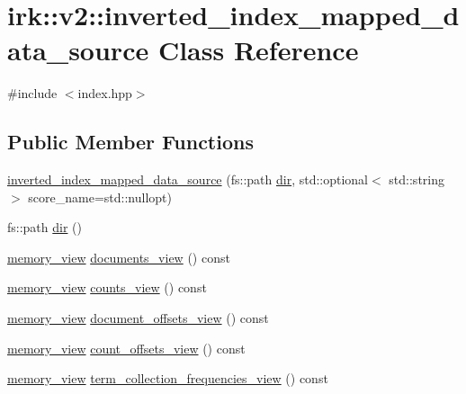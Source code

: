 \hypertarget{classirk_1_1v2_1_1inverted__index__mapped__data__source}{}\section{irk\+:\+:v2\+:\+:inverted\+\_\+index\+\_\+mapped\+\_\+data\+\_\+source Class Reference}
\label{classirk_1_1v2_1_1inverted__index__mapped__data__source}


{\ttfamily \#include $<$index.\+hpp$>$}

\subsection*{Public Member Functions}
\begin{DoxyCompactItemize}
\item 
\mbox{\hyperlink{classirk_1_1v2_1_1inverted__index__mapped__data__source_ac0d35968322d01a287985563b0fe7944}{inverted\+\_\+index\+\_\+mapped\+\_\+data\+\_\+source}} (fs\+::path \mbox{\hyperlink{classirk_1_1v2_1_1inverted__index__mapped__data__source_af8e4ab45e3616f308c50f86b8059d4bc}{dir}}, std\+::optional$<$ std\+::string $>$ score\+\_\+name=std\+::nullopt)
\item 
fs\+::path \mbox{\hyperlink{classirk_1_1v2_1_1inverted__index__mapped__data__source_af8e4ab45e3616f308c50f86b8059d4bc}{dir}} ()
\item 
\mbox{\hyperlink{classirk_1_1memory__view}{memory\+\_\+view}} \mbox{\hyperlink{classirk_1_1v2_1_1inverted__index__mapped__data__source_ab0f63b289b23eff5f3bc45e37fb4caca}{documents\+\_\+view}} () const
\item 
\mbox{\hyperlink{classirk_1_1memory__view}{memory\+\_\+view}} \mbox{\hyperlink{classirk_1_1v2_1_1inverted__index__mapped__data__source_ab8ee89932b98c71d6a04b5cd2c8e88fe}{counts\+\_\+view}} () const
\item 
\mbox{\hyperlink{classirk_1_1memory__view}{memory\+\_\+view}} \mbox{\hyperlink{classirk_1_1v2_1_1inverted__index__mapped__data__source_aea3fe4637b8a95e8450f1a0591e1a76b}{document\+\_\+offsets\+\_\+view}} () const
\item 
\mbox{\hyperlink{classirk_1_1memory__view}{memory\+\_\+view}} \mbox{\hyperlink{classirk_1_1v2_1_1inverted__index__mapped__data__source_a167c16e68633483deea05552d465ff60}{count\+\_\+offsets\+\_\+view}} () const
\item 
\mbox{\hyperlink{classirk_1_1memory__view}{memory\+\_\+view}} \mbox{\hyperlink{classirk_1_1v2_1_1inverted__index__mapped__data__source_a9d8df0423e6890e3086366aa20751be2}{term\+\_\+collection\+\_\+frequencies\+\_\+view}} () const

\end{DoxyCompactItemize}
